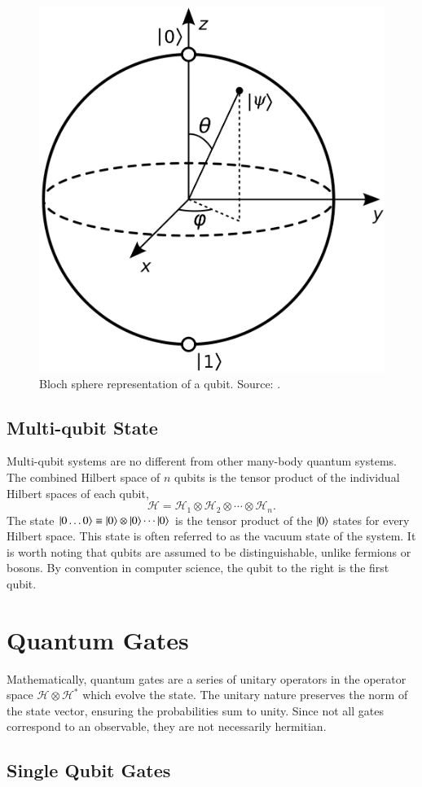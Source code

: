 \begin{figure}[ht]
	\centering
	\includegraphics[width=0.5\linewidth]{image/bloch.png}
	\caption{Bloch sphere representation of a qubit. Source: \cite{bloch_sphere_wikipedia}.}
	\label{fig:bloch_sphere}
\end{figure}

\subsection{Multi-qubit State}
Multi-qubit systems are no different from other many-body quantum systems. The combined Hilbert space of $ n $ qubits is the tensor product of the individual Hilbert spaces of each qubit,
\begin{equation}
	\mathcal{H} = \mathcal{H}_1 \otimes \mathcal{H}_2 \otimes \cdots \otimes \mathcal{H}_n.
\end{equation}
The state $ \ket{0 \ldots 0} \equiv \ket{0} \otimes \ket{0} \cdots \ket{0}$ is the tensor product of the $\ket{0}$ states for every Hilbert space. This state is often referred to as the vacuum state of the system. It is worth noting that qubits are assumed to be distinguishable, unlike fermions or bosons. By convention in computer science, the qubit to the right is the first qubit.

\section{Quantum Gates}
\label{sec:quantum_gates}
Mathematically, quantum gates are a series of unitary operators in the operator space $ \mathcal{H} \otimes \mathcal{H}^{*}$ which evolve the state. The unitary nature preserves the norm of the state vector, ensuring the probabilities sum to unity. Since not all gates correspond to an observable, they are not necessarily hermitian. 
\subsection{Single Qubit Gates}

